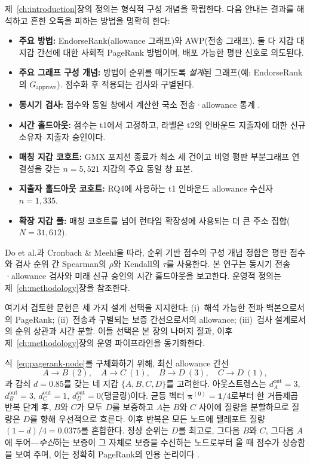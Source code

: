 
제~\ref{ch:introduction}장의 정의는 형식적 구성 개념을 확립한다. 다음 안내는 결과를 해석하고 흔한 오독을 피하는 방법을 명확히 한다:

\begin{itemize}
\item \textbf{주요 방법:} EndorseRank(allowance 그래프)와 AWP(전송 그래프). 둘 다 지갑 대 지갑 간선에 대한 사회적 PageRank 방법이며, 배포 가능한 평판 신호로 의도된다.
\item \textbf{주요 그래프 구성 개념:} 방법이 순위를 매기도록 \emph{설계}된 그래프(예: EndorseRank의 $G_{\text{approve}}$). 점수화 후 적용되는 검사와 구별된다.
\item \textbf{동시기 검사:} 점수와 동일 창에서 계산한 국소 전송·allowance 통계 .
\item \textbf{시간 홀드아웃:} 점수는 t1에서 고정하고, 라벨은 t2의 인바운드 지출자에 대한 신규 소유자--지출자 승인이다.
\item \textbf{매칭 지갑 코호트:} GMX 포지션 종료가 최소 세 건이고 비영 평판 부분그래프 연결성을 갖는 $n=5{,}521$ 지갑의 주요 동일 창 표본.
\item \textbf{지출자 홀드아웃 코호트:} RQ4에 사용하는 t1 인바운드 allowance 수신자 $n=1{,}335$.
\item \textbf{확장 지갑 풀:} 매칭 코호트를 넘어 런타임 확장성에 사용되는 더 큰 주소 집합($N=31{,}612$).
\end{itemize}


Do et al.과 Cronbach \& Meehl을 따라, 순위 기반 점수의 구성 개념 정합은 평판 점수와 검사 순위 간 Spearman의 $\rho$와 Kendall의 $\tau$를 사용한다. 본 연구는 동시기 전송·allowance 검사와 미래 신규 승인의 시간 홀드아웃을 보고한다. 운영적 정의는 제~\ref{ch:methodology}장을 참조한다.

여기서 검토한 문헌은 세 가지 설계 선택을 지지한다: (i)~해석 가능한 전파 백본으로서의 PageRank; (ii)~전송과 구별되는 보증 간선으로서의 allowance; (iii)~검사 설계로서의 순위 상관과 시간 분할. 이들 선택은 본 장의 나머지 절과, 이후 제~\ref{ch:methodology}장의 운영 파이프라인을 동기화한다.


식~\eqref{eq:pagerank-node}를 구체화하기 위해, 최신 allowance 간선
\[
A\to B\ (2),\quad A\to C\ (1),\quad B\to D\ (3),\quad C\to D\ (1),
\]
과 감쇠 $d=0.85$를 갖는 네 지갑 $\{A,B,C,D\}$를 고려한다. 아웃스트렝스는 $d_A^{\mathrm{out}}=3$, $d_B^{\mathrm{out}}=3$, $d_C^{\mathrm{out}}=1$, $d_D^{\mathrm{out}}=0$(댕글링)이다. 균등 벡터 $\boldsymbol{\pi}^{(0)}=\mathbf{1}/4$로부터 한 거듭제곱 반복 단계 후, $B$와 $C$가 모두 $D$를 보증하고 $A$는 $B$와 $C$ 사이에 질량을 분할하므로 질량은 $D$를 향해 우선적으로 흐른다. 이후 반복은 모든 노드에 텔레포트 질량 $(1-d)/4=0.0375$를 혼합한다. 정상 순위는 $D$를 최고로, 그다음 $B$와 $C$, 그다음 $A$에 두어---\emph{수신}하는 보증이 그 자체로 보증을 수신하는 노드로부터 올 때 점수가 상승함을 보여 주며, 이는 정확히 PageRank의 인용 논리이다 .

